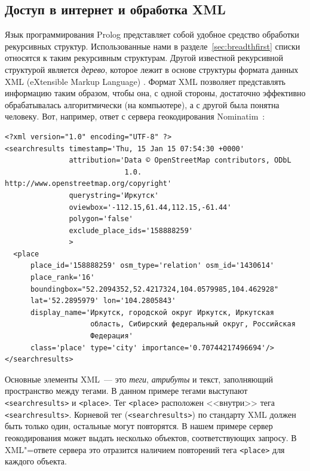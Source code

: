 \documentclass[a4paper,14pt, openany, twoside, draft]{extbook} %
\begin{document}
\subsection{Доступ в интернет и обработка XML}
\label{sec:inetxml}

Язык программирования Prolog представляет собой удобное средство обработки рекурсивных структур.  Использованные нами в разделе~\ref{sec:breadthfirst} списки относятся к таким рекурсивным структурам.  Другой известной рекурсивной структурой является \emph{дерево}, которое лежит в основе структуры формата данных XML (\foreignlanguage{english}{eXtensible Markup Language}) \cite{xml}.  Формат XML позволяет представлять информацию таким образом, чтобы она, с одной стороны, достаточно эффективно обрабатывалась алгоритмически (на компьютере), а с другой была понятна человеку.  Вот, например, ответ с сервера геокодирования \foreignlanguage{latin}{Nominatim} \cite{nominatim}\,:

\begin{verbatim}
<?xml version="1.0" encoding="UTF-8" ?>
<searchresults timestamp='Thu, 15 Jan 15 07:54:30 +0000'
               attribution='Data © OpenStreetMap contributors, ODbL
                            1.0. http://www.openstreetmap.org/copyright'
               querystring='Иркутск'
               oviewbox='-112.15,61.44,112.15,-61.44'
               polygon='false'
               exclude_place_ids='158888259'
               >
  <place
      place_id='158888259' osm_type='relation' osm_id='1430614'
      place_rank='16'
      boundingbox="52.2094352,52.4217324,104.0579985,104.462928"
      lat='52.2895979' lon='104.2805843'
      display_name='Иркутск, городской округ Иркутск, Иркутская
                    область, Сибирский федеральный округ, Российская
                    Федерация'
      class='place' type='city' importance='0.70744217496694'/>
</searchresults>
\end{verbatim}


Основные элементы XML~--- это \emph{теги}, \emph{атрибуты} и текст, заполняющий пространство между тегами.  В данном примере тегами выступают \texttt{<searchresults>} и \texttt{<place>}.  Тег \texttt{<place>} расположен <<внутри>> тега \texttt{<searchresults>}.  Корневой тег (\texttt{<searchresults>}) по стандарту XML должен быть только один, остальные могут повторятся.  В нашем примере сервер геокодирования может выдать несколько объектов, соответствующих запросу.  В XML"=ответе сервера это отразится наличием повторений тега \texttt{<place>} для каждого объекта.
\end{document}

